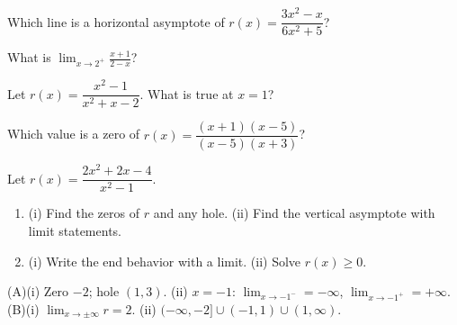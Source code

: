 \begin{exo}[1.7]{}
Which line is a horizontal asymptote of $r(x)=\dfrac{3x^2-x}{6x^2+5}$?
\end{exo}
\begin{exo}[1.9]{}
What is $\displaystyle\lim_{x\to2^+}\frac{x+1}{2-x}$?
\end{exo}
\begin{exo}[1.10]{}
Let $r(x)=\dfrac{x^2-1}{x^2+x-2}$. What is true at $x=1$?
\end{exo}
\begin{exo}[1.8]{}
Which value is a zero of $r(x)=\dfrac{(x+1)(x-5)}{(x-5)(x+3)}$?
\end{exo}
\begin{exo}{}
Let $r(x)=\dfrac{2x^2+2x-4}{x^2-1}$.
\begin{enumerate}[label=(\Alph*)]
\item (i) Find the zeros of $r$ and any hole. (ii) Find the vertical asymptote with limit statements.
\item (i) Write the end behavior with a limit. (ii) Solve $r(x)\ge0$.
\end{enumerate}
\begin{solution}
(A)(i) Zero $-2$; hole $(1,3)$. (ii) $x=-1$: $\lim_{x\to-1^-}=-\infty$, $\lim_{x\to-1^+}=+\infty$.\\
(B)(i) $\lim_{x\to\pm\infty}r=2$. (ii) $(-\infty,-2]\cup(-1,1)\cup(1,\infty)$.
\end{solution}
\end{exo}

